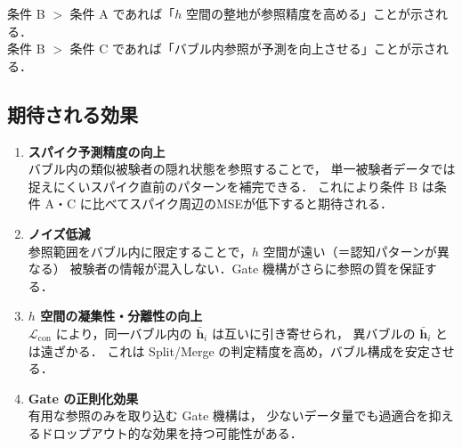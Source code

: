 \documentclass[12pt, a4paper]{ltjsarticle}
\begin{document}
\noindent
条件 B $>$ 条件 A であれば「$h$ 空間の整地が参照精度を高める」ことが示される．\\
条件 B $>$ 条件 C であれば「バブル内参照が予測を向上させる」ことが示される．

\subsection{期待される効果}

\begin{enumerate}
  \item \textbf{スパイク予測精度の向上}\\
    バブル内の類似被験者の隠れ状態を参照することで，
    単一被験者データでは捉えにくいスパイク直前のパターンを補完できる．
    これにより条件 B は条件 A・C に比べてスパイク周辺のMSEが低下すると期待される．

  \item \textbf{ノイズ低減}\\
    参照範囲をバブル内に限定することで，$h$ 空間が遠い（＝認知パターンが異なる）
    被験者の情報が混入しない．Gate 機構がさらに参照の質を保証する．

  \item \textbf{$h$ 空間の凝集性・分離性の向上}\\
    $\mathcal{L}_{\text{con}}$ により，同一バブル内の $\bar{\bm{h}}_i$ は互いに引き寄せられ，
    異バブルの $\bar{\bm{h}}_i$ とは遠ざかる．
    これは Split/Merge の判定精度を高め，バブル構成を安定させる．

  \item \textbf{Gate の正則化効果}\\
    有用な参照のみを取り込む Gate 機構は，
    少ないデータ量でも過適合を抑えるドロップアウト的な効果を持つ可能性がある．
\end{enumerate}
\end{document}
